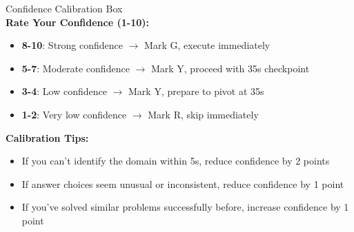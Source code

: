 \documentclass{article}
\begin{document}
\begin{classifybox}{Confidence Calibration Box}
{\footnotesize\textcolor{timegreen}{}}\\
\textbf{Rate Your Confidence (1-10):}
\begin{itemize}[nosep]
\item \textbf{8-10}: Strong confidence $\rightarrow$ Mark \colorbox{green!20}{G}, execute immediately
\item \textbf{5-7}: Moderate confidence $\rightarrow$ Mark \colorbox{yellow!20}{Y}, proceed with 35s checkpoint
\item \textbf{3-4}: Low confidence $\rightarrow$ Mark \colorbox{yellow!20}{Y}, prepare to pivot at 35s
\item \textbf{1-2}: Very low confidence $\rightarrow$ Mark \colorbox{red!20}{R}, skip immediately
\end{itemize}
\textbf{Calibration Tips:}
\begin{itemize}[nosep]
\item If you can't identify the domain within 5s, reduce confidence by 2 points
\item If answer choices seem unusual or inconsistent, reduce confidence by 1 point
\item If you've solved similar problems successfully before, increase confidence by 1 point
\end{itemize}
\end{classifybox}
\end{document}

